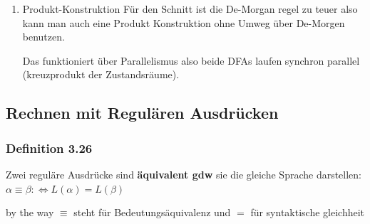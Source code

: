 \documentclass[11pt]{article}
\begin{document}
\begin{enumerate}
\item Produkt-Konstruktion
\label{sec:org424eabf}
Für den Schnitt ist die De-Morgan regel zu teuer also kann man auch eine Produkt Konstruktion ohne Umweg über De-Morgen benutzen.

Das funktioniert über Parallelismus also beide DFAs laufen synchron parallel (kreuzprodukt der Zustandsräume).
\end{enumerate}

\subsection{Rechnen mit Regulären Ausdrücken}
\label{sec:orgcc6212d}
\subsubsection{Definition 3.26}
\label{sec:orge04428c}
Zwei reguläre Ausdrücke sind \textbf{äquivalent gdw} sie die gleiche Sprache darstellen:
\(\alpha \equiv \beta: \Leftrightarrow L(\alpha) = L(\beta)\)

by the way \(\equiv\) steht für Bedeutungsäquivalenz und \(=\) für syntaktische gleichheit
\end{document}
